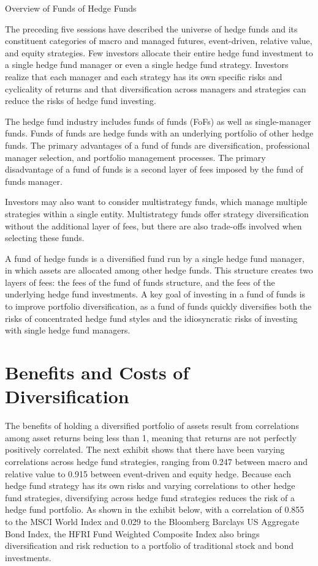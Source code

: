 \documentclass[11pt]{article}
\begin{document}
Overview of Funds of Hedge Funds

The preceding five sessions have described the universe of hedge funds and its constituent categories of macro and managed futures, event-driven, relative value, and equity strategies. Few investors allocate their entire hedge fund investment to a single hedge fund manager or even a single hedge fund strategy. Investors realize that each manager and each strategy has its own specific risks and cyclicality of returns and that diversification across managers and strategies can reduce the risks of hedge fund investing.

The hedge fund industry includes funds of funds (FoFs) as well as single-manager funds. Funds of funds are hedge funds with an underlying portfolio of other hedge funds. The primary advantages of a fund of funds are diversification, professional manager selection, and portfolio management processes. The primary disadvantage of a fund of funds is a second layer of fees imposed by the fund of funds manager.

Investors may also want to consider multistrategy funds, which manage multiple strategies within a single entity. Multistrategy funds offer strategy diversification without the additional layer of fees, but there are also trade-offs involved when selecting these funds.

A fund of hedge funds is a diversified fund run by a single hedge fund manager, in which assets are allocated among other hedge funds. This structure creates two layers of fees: the fees of the fund of funds structure, and the fees of the underlying hedge fund investments. A key goal of investing in a fund of funds is to improve portfolio diversification, as a fund of funds quickly diversifies both the risks of concentrated hedge fund styles and the idiosyncratic risks of investing with single hedge fund managers.

\section*{Benefits and Costs of Diversification}
The benefits of holding a diversified portfolio of assets result from correlations among asset returns being less than 1, meaning that returns are not perfectly positively correlated. The next exhibit shows that there have been varying correlations across hedge fund strategies, ranging from 0.247 between macro and relative value to 0.915 between event-driven and equity hedge. Because each hedge fund strategy has its own risks and varying correlations to other hedge fund strategies, diversifying across hedge fund strategies reduces the risk of a hedge fund portfolio. As shown in the exhibit below, with a correlation of 0.855 to the MSCI World Index and 0.029 to the Bloomberg Barclays US Aggregate Bond Index, the HFRI Fund Weighted Composite Index also brings diversification and risk reduction to a portfolio of traditional stock and bond investments.
\end{document}
